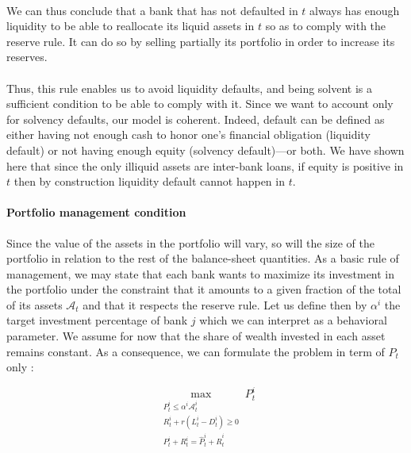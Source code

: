 \documentclass{article}
\newcommand{\othernote}[1]{\textcolor{darkgreen}{\textit{Dimitri: #1}}}
\begin{document}
\paragraph{}
We can thus conclude that a bank that has not defaulted in $t$ always has enough liquidity to be able to reallocate its liquid assets in $t$ so as to comply with the reserve rule. It can do so by selling partially its portfolio in order to increase its reserves.

\paragraph{}
Thus, this rule enables us to avoid liquidity defaults, and being solvent is a sufficient condition to be able to comply with it. Since we want to account only for solvency defaults, our model is coherent. Indeed, default can be defined as either having not enough cash to honor one's financial obligation (liquidity default) or not having enough equity (solvency default)---or both. We have shown here that since the only illiquid assets are inter-bank loans, if equity is positive in $t$ then by construction liquidity default cannot happen in $t$. 



\paragraph{Portfolio management condition}
Since the value of the assets in the portfolio will vary, so will the size of the portfolio in relation to the rest of the balance-sheet quantities. As a basic rule of management, we may state that each bank wants to maximize its investment in the portfolio under the constraint that it amounts to a given fraction of the total of its assets $\mathcal{A}_t$ and that it respects the reserve rule. Let us define then by $\alpha^i$ the target investment percentage of bank $j$ which we can interpret as a behavioral parameter. We assume for now that the share of wealth invested in each asset remains constant. As a consequence, we  can formulate the problem in term of $P_t$ only :

$$\max_{\substack{P_t^i \leq \alpha^i \mathcal{A}_t^i \\ R_t^i + r(L_t^i - D_t^i) \geq 0 \\ P_t^i + R_t^i = \widehat{P}_t^i + \widehat{R}_t^i}} P_t^i$$
\end{document}
